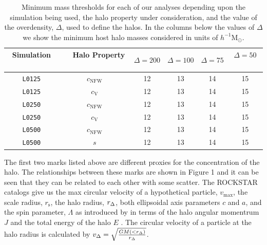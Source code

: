 \documentclass[usenatbib,usegraphicx,letterpaper]{mn2e}
\begin{document}
\begin{table}
\caption{
Minimum mass thresholds for each of our analyses depending upon the simulation being used, the halo property under consideration, and the 
value of the overdensity, $\Delta$, used to define the halos. In the columns below the values of $\Delta$ we show the minimum host halo masses 
considered in units of $h^{-1}\mathrm{M}_{\odot}$. }
\vspace*{8pt}
\begin{tabular}{ c c c c c c }
\hline
\hline
Simulation \ \ & \ \ Halo Property \ \  & $\Delta=200$ & $\Delta=100$ & $\Delta=75$ & $\Delta=50$ \ \\
\hline
{\tt L0125} & $c_{\mathrm{NFW}}$ & 12 & 13 & 14 & 15  \\
{\tt L0125} & $c_{\mathrm{V}}$ & 12 & 13 & 14 & 15 \\
\hline
{\tt L0250} & $c_{\mathrm{NFW}}$ & 12 & 13 & 14 & 15 \\
{\tt L0250} & $c_{\mathrm{V}}$ & 12 & 13 & 14 & 15 \\
\hline
{\tt L0500} & $c_{\mathrm{NFW}}$ & 12 & 13 & 14 & 15 \\
{\tt L0500} & $s$ & 12 & 13 & 14 & 15 \\
\hline
\hline
\end{tabular}
\label{table:thresholds}
\end{table}




The first two marks listed above are different proxies for the concentration of the halo. The relationships between these marks are shown in Figure 1 and it can be seen that they can be related to each other with some scatter. The ROCKSTAR catalogs give us the max  circular velocity of a hypothetical particle, $v_{\mathrm{max}}$, the scale radius, $r_{\mathrm{s}}$, the halo radius, $r_{\Delta}$, both ellipsoidal axis parameters $c$ and $a$, and the spin parameter, $\Lambda$ as introduced by \citep{peebles69} in terms of the halo angular momentrum $J$ and the total energy of the halo $E$ . The circular velocity of a particle at the halo radius is calculated by $v_{\Delta} = \sqrt{\frac{G M(< r_{\Delta})}{r_{\Delta}}}$.
\end{document}
